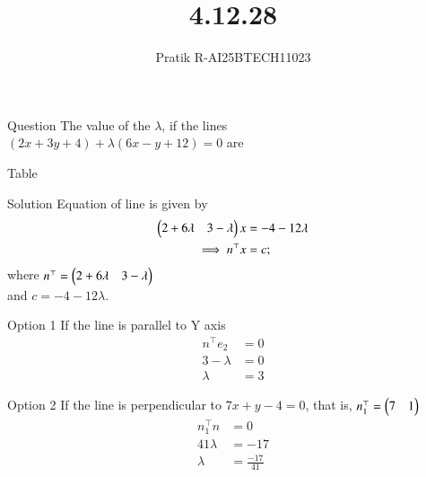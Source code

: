 \documentclass{beamer}
\title 
{4.12.28}
\author 
{Pratik R-AI25BTECH11023}
\begin{document}
\frame{\titlepage}
\begin{frame}{Question}
The value of the $\lambda$,  if the lines\\$(2x+3y+4)+\lambda(6x-y+12)=0$ are
\end{frame}

\begin{frame}{Table}
    
\end{frame}
\begin{frame}{Solution} 
Equation of line is given by
\begin{align}
    \begin{pmatrix}2+6\lambda &3-\lambda\end{pmatrix} x &=-4-12\lambda\\
    \implies n^\top x &= c;
\end{align}
where $n^\top = \begin{pmatrix}2+6\lambda &3-\lambda\end{pmatrix}$\\
and $c=-4-12\lambda$. \\
\end{frame}
\begin{frame}{Option 1}
If the line is parallel to Y axis
\begin{align}
n^\top e_2 &=0 \\
3 -\lambda &= 0 \\
\lambda &= 3
\end{align}
\end{frame}

\begin{frame}{Option 2}
If the line is perpendicular to $7x+y-4=0$, that is, $n_1^\top =\begin{pmatrix}7&1\end{pmatrix}$
\begin{align}
    n_1^\top n &= 0 \\
    41\lambda &= -17 \\
    \lambda &= \frac{-17}{41}
\end{align}
\end{frame}
\end{document}
